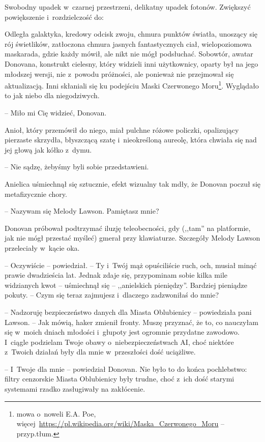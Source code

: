 \documentclass[oneside,polish,11pt,sfheadings]{mwbk}
\begin{document}
Swobodny upadek w~czarnej przestrzeni, delikatny upadek fotonów.
Zwiększyć powiększenie i~rozdzielczość do:

Odległa galaktyka, kredowy odcisk zwoju, chmura punktów światła,
unoszący się rój świetlików, zatłoczona chmura jasnych fantastycznych
ciał, wielopoziomowa maskarada, gdzie każdy mówił, ale nikt nie mógł
podsłuchać. Sobowtór, awatar Donovana, konstrukt cielesny, który
widzieli inni użytkownicy, oparty był na jego młodszej wersji, nie z~powodu próżności, ale ponieważ nie przejmował się aktualizacją. Inni
skłaniali się ku podejściu Maski Czerwonego Moru\footnote{mowa o~noweli E.A.
Poe,
więcej~\url{https://pl.wikipedia.org/wiki/Maska\_Czerwonego\_Moru}
-- przyp.tłum.}. Wyglądało to jak niebo dla niegodziwych.

-- Miło mi Cię widzieć, Donovan.

Anioł, który przemówił do niego, miał pulchne różowe policzki,
opalizujący pierzaste skrzydła, błyszczącą szatę i~nieokreśloną aureolę,
która chwiała się nad jej głową jak kółko z~dymu.

-- Nie sądzę, żebyśmy byli sobie przedstawieni.

Anielica uśmiechnął się sztucznie, efekt wizualny tak mdły, że Donovan
poczuł się metafizycznie chory.

-- Nazywam się Melody Lawson. Pamiętasz mnie?

Donovan próbował podtrzymać iluzję teleobecności, gdy (,,tam'' na
platformie, jak nie mógł przestać myśleć) gmerał przy klawiaturze.
Szczegóły Melody Lawson przeleciały w~kącie oka.

-- Oczywiście -- powiedział. -- Ty i~Twój mąż opuściliście ruch, och,
musiał minąć prawie dwadzieścia lat. Jednak zdaje się, przypominam sobie
kilka mile widzianych kwot -- uśmiechnął się -- ,,anielskich pieniędzy''.
Bardziej pieniądze pokuty. -- Czym się teraz zajmujesz i~dlaczego
zadzwoniłaś do mnie?

-- Nadzoruję bezpieczeństwo danych dla Miasta Oblubienicy -- powiedziała
pani Lawson. -- Jak mówią, haker zmienił fronty. Muszę przyznać, że to,
co nauczyłam się w~moich dniach młodości i~głupoty jest ogromnie
przydatne zawodowo. I~ciągle podzielam Twoje obawy o~niebezpieczeństwach AI, choć niektóre z~Twoich działań były dla mnie w~przeszłości dość uciążliwe.

-- I~Twoje dla mnie -- powiedział Donovan. Nie było to do końca
pochlebstwo: filtry cenzorskie Miasta Oblubienicy były trudne, choć z~ich dość starymi systemami rzadko zasługiwały na zakłócenie.
\end{document}
